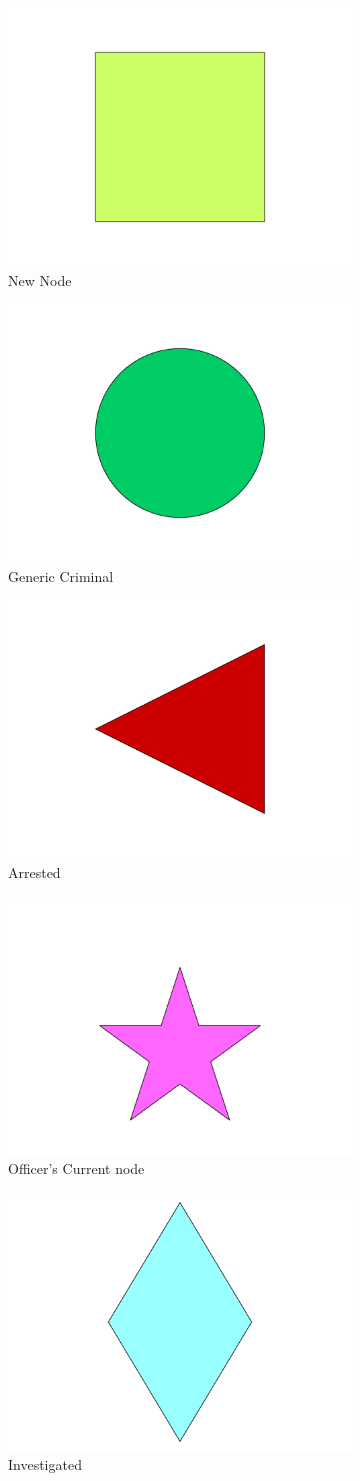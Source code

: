 \documentclass[11pt]{article}
\begin{document}
\begin{figure}\centering \begin{subfigure}[t]{.12\textwidth}\centering\begin{LARGE}
\includegraphics[width = .2\textwidth]{0.pdf}
\caption{New Node}\end{LARGE}\end{subfigure}
\quad\quad\quad
 \begin{subfigure}[t]{.12\textwidth}\centering\begin{LARGE}
\includegraphics[width = .2\textwidth]{1.pdf}
\caption{Generic Criminal}\end{LARGE}\end{subfigure}
\quad\quad\quad
 \begin{subfigure}[t]{.12\textwidth}\centering\begin{LARGE}
\includegraphics[width = .2\textwidth]{2.pdf}
\caption{Arrested}\end{LARGE}\end{subfigure}
\quad\quad\quad
 \begin{subfigure}[t]{.12\textwidth}\centering\begin{LARGE}
\includegraphics[width = .2\textwidth]{3.pdf}
\caption{Officer's Current node}\end{LARGE}\end{subfigure}
\quad\quad\quad
 \begin{subfigure}[t]{.12\textwidth}\centering\begin{LARGE}
\includegraphics[width = .2\textwidth]{4.pdf}
\caption{Investigated}\end{LARGE}\end{subfigure}
\caption{}
\end{figure}
\end{document}
